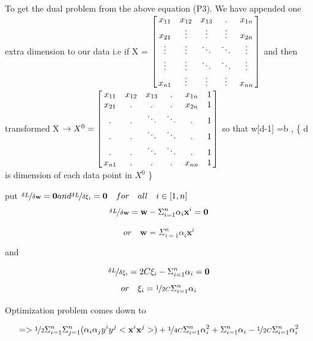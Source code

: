 \documentclass{article}
\begin{document}
To get the dual problem  from the above equation (P3).
We have appended one extra dimension to our data i.e if X = $ \left[ \begin{array}{@{\,} ccccc @{\,}}
    x_{11}	& x_{12} & x_{13} & . & x_{1n}  \\
    x_{21} & \vdots & \vdots & \vdots  & x_{2n} \\
    \vdots & \vdots & \ddots & \ddots & \vdots \\
    \vdots & \vdots & \ddots & \ddots & \vdots \\
    x_{n1} & \vdots & \vdots & \vdots  & x_{nn} 
  \end{array} \right] $
 and then transformed  X $ \rightarrow X^0 = \left[ \begin{array}{@{\,} cccccc @{\,}}
    x_{11} & x_{12} & x_{13} &  .& x_{1n} & 1  \\
    x_{21} & . & . & . & x_{2n} & 1\\
    . & . & \ddots & \ddots & . & 1\\
    . & . & \ddots & \ddots& . & 1\\
    . & . & \ddots & \ddots& . & 1\\
    x_{n1} & . & . & .  & x_{nn} & 1\\
  \end{array} \right] $ so that w[d-1] =b , \{ d is dimension of each data point in $ X^0 $ \}



put $ \nicefrac{ \delta L }{ \delta \textbf{w} } = \textbf{0} and  \nicefrac{ \delta L }{ \delta \xi _i } = \textbf{0}  \quad for \quad all \quad i \in [1,n] $
\[ \nicefrac{ \delta L }{ \delta \textbf{w} } = \textbf{w} - \Sigma _{i=1} ^n \alpha _i \textbf{x} ^i = \textbf{0}  \]


\[ or \quad \textbf{w} = \Sigma _{i=1} ^n \alpha _i \textbf{x} ^i \]


 and

\[    \nicefrac{ \delta L }{ \delta \xi _i } =2C \xi _i  - \Sigma _{i=1} ^n \alpha _i = \textbf{0}  \]
\[ or \quad \xi _i = \nicefrac{1}{2C} \Sigma _{i=1} ^n \alpha _i  \]


Optimization problem comes down to 

\[ => \nicefrac{1}{2} \Sigma _{i=1} ^n \Sigma _{j=1} ^n ( \alpha _i \alpha _j y^i y^j< \textbf{x}^i \textbf{x}^j>) +  \nicefrac{1}{4C} \Sigma _{i=1} ^n  \alpha _i ^2 + \Sigma _{ i=1 } ^n \alpha_i - \nicefrac{1}{2C}\Sigma _{i=1} ^n  \alpha _i ^2 \]
\end{document}
